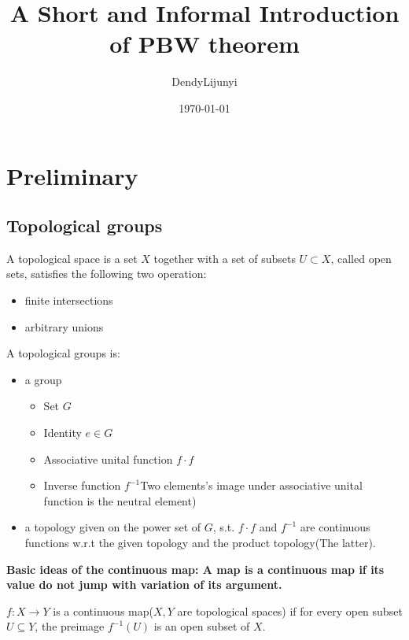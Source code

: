 \documentclass[11pt]{article}
\author{DendyLijunyi}
\date{\today}
\title{A Short and Informal Introduction of PBW theorem}
\begin{document}
\maketitle
\tableofcontents

\section{Preliminary}
\label{sec:orgc5fd9bf}
\subsection{Topological groups}
\label{sec:orga6b4e1c}
\begin{definition}
A topological space is a set \(X\) together with a set of subsets \(U \subset X\), called open sets, satisfies the following two operation:
\begin{itemize}
\item finite intersections
\item arbitrary unions
\end{itemize}
\end{definition}

\begin{definition}
A topological groups is:
\begin{itemize}
\item a group
\begin{itemize}
\item Set \(G\)
\item Identity \(e\in G\)
\item Associative unital function \(f \cdot f\)
\item Inverse function \(f^{-1}\)Two elements's image under associative unital function is the neutral element)
\end{itemize}
\item a topology given on the power set of \(G\), s.t. \(f \cdot f\) and \(f^{-1}\) are continuous functions w.r.t the given topology and the product topology(The latter).
\end{itemize}
\end{definition}


\textbf{Basic ideas of the continuous map: A map is a continuous map if its value do not jump with variation of its argument.}

\begin{definition}
\(f: X \to Y\) is a continuous map(\(X,Y\) are topological spaces) if for every open subset \(U \subseteq Y\), the preimage \(f^{-1}(U)\) is an open subset of \(X\).
\end{definition}
\end{document}
